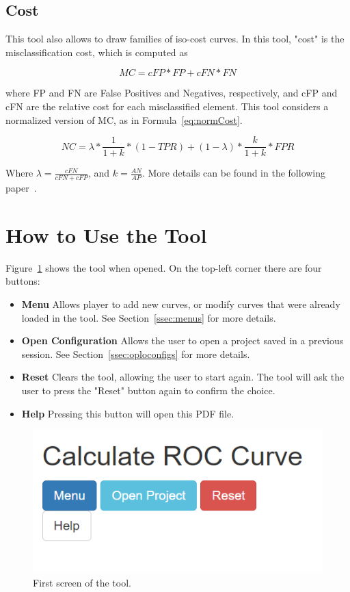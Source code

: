 \documentclass{article}
\begin{document}
	\subsection{Cost}
	This tool also allows to draw families of iso-cost curves. In this tool, "cost" is the misclassification cost, which is computed as
	
	\begin{equation} \label{eq:mccost}
		MC = cFP*FP + cFN*FN
	\end{equation}
	
	where FP and FN are False Positives and Negatives, respectively, and cFP and cFN are the relative cost for each misclassified element. This tool considers a normalized version of MC, as in Formula~\ref{eq:normCost}. 
	
	\begin{equation} \label{eq:normCost}
		NC = \lambda*\frac{1}{1+k}*(1-TPR) + (1-\lambda)*\frac{k}{1+k}*FPR
	\end{equation} 
	
	Where $\lambda = \frac{cFN}{cFN+cFP}$, and $k = \frac{AN}{AP}$. More details can be found in the following paper~\cite{morasca2020assessment}.
	
	\section{How to Use the Tool}
	Figure~\ref{fig:screen1} shows the tool when opened. On the top-left corner there are four buttons:
	\begin{itemize}
		\item \textbf{Menu} Allows player to add new curves, or modify curves that were already loaded in the tool. See Section~\ref{ssec:menus} for more details.
		\item \textbf{Open Configuration} Allows the user to open a project saved in a previous session. See Section~\ref{ssec:oploconfigs} for more details.
		\item \textbf{Reset} Clears the tool, allowing the user to start again. The tool will ask the user to press the "Reset" button again to confirm the choice.
		\item \textbf{Help} Pressing this button will open this PDF file.
	\end{itemize}
	
	\begin{figure}[h!]
		\centering
		\caption{First screen of the tool.}
		\label{fig:screen1}
		\includegraphics[width=1\linewidth]{Figures/screen1.png}
	\end{figure}
	 
\end{document}
